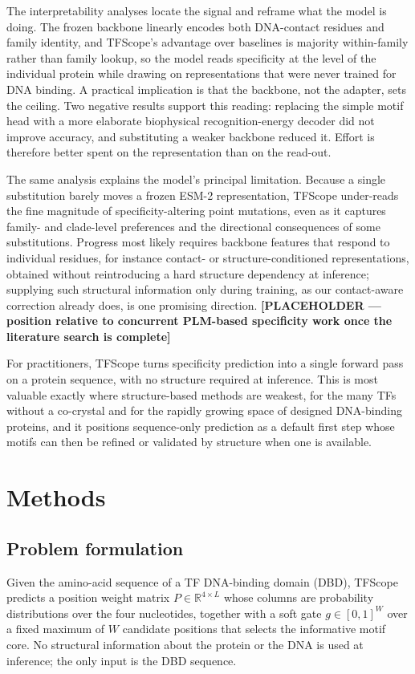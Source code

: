 \documentclass[11pt]{article}
\newcommand{\PLACEHOLDER}[1]{{\color{orange}\textbf{[PLACEHOLDER --- #1]}}}
\begin{document}
The interpretability analyses locate the signal and reframe what the model is doing.
The frozen backbone linearly encodes both DNA-contact residues and family identity,
and TFScope's advantage over baselines is majority within-family rather than family
lookup, so the model reads specificity at the level of the individual protein while
drawing on representations that were never trained for DNA binding. A practical
implication is that the backbone, not the adapter, sets the ceiling. Two negative
results support this reading: replacing the simple motif head with a more elaborate
biophysical recognition-energy decoder did not improve accuracy, and substituting a
weaker backbone reduced it. Effort is therefore better spent on the representation
than on the read-out.

The same analysis explains the model's principal limitation. Because a single
substitution barely moves a frozen ESM-2 representation, TFScope under-reads the fine
magnitude of specificity-altering point mutations, even as it captures family- and
clade-level preferences and the directional consequences of some substitutions.
Progress most likely requires backbone features that respond to individual residues,
for instance contact- or structure-conditioned representations, obtained without
reintroducing a hard structure dependency at inference; supplying such structural
information only during training, as our contact-aware correction already does, is one
promising direction. \PLACEHOLDER{position relative to concurrent PLM-based
specificity work once the literature search is complete}

For practitioners, TFScope turns specificity prediction into a single forward pass on
a protein sequence, with no structure required at inference. This is most valuable
exactly where structure-based methods are weakest, for the many TFs without a
co-crystal and for the rapidly growing space of designed DNA-binding proteins, and it
positions sequence-only prediction as a default first step whose motifs can then be
refined or validated by structure when one is available.

\section*{Methods}
\small

\subsection*{Problem formulation}
Given the amino-acid sequence of a TF DNA-binding domain (DBD), TFScope predicts a
position weight matrix $P \in \mathbb{R}^{4 \times L}$ whose columns are probability
distributions over the four nucleotides, together with a soft gate $g \in [0,1]^{W}$
over a fixed maximum of $W$ candidate positions that selects the informative motif
core. No structural information about the protein or the DNA is used at inference; the
only input is the DBD sequence.
\end{document}

